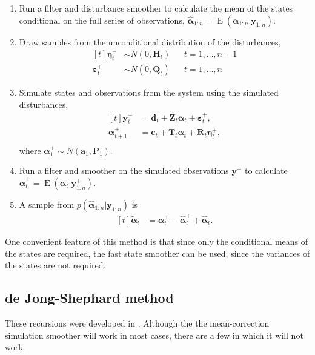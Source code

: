 \documentclass[]{book}
\providecommand{\tightlist}{%
  \setlength{\itemsep}{0pt}\setlength{\parskip}{0pt}}
\DeclareMathOperator{\E}{E}
\newcommand{\mat}[1]{\boldsymbol{#1}}
\renewcommand{\vec}[1]{\boldsymbol{#1}}
\begin{document}
\begin{enumerate}
\def\labelenumi{\arabic{enumi}.}
\tightlist
\item
  Run a filter and disturbance smoother to calculate the mean of the
  states conditional on the full series of observations,
  \(\hat{\vec{\alpha}}_{1:n} = \E(\vec{\alpha}_{1:n} | \vec{y}_{1:n})\).
\item
  Draw samples from the unconditional distribution of the disturbances,
  \[
  \begin{aligned}[t]
  \vec{\eta}^+_t &\sim N(0, \mat{H}_t) && t = 1, \dots, n - 1 \\
  \vec{\varepsilon}^+_t &\sim N(0, \mat{Q}_t) && t = 1, \dots, n
  \end{aligned}
  \]
\item
  Simulate states and observations from the system using the simulated
  disturbances, \[
  \begin{aligned}[t]
  \vec{y}^+_t &= \vec{d}_t + \mat{Z}_t \vec{\alpha}_t + \vec{\varepsilon}^+_t, \\
  \vec{\alpha}^+_{t + 1} &= \vec{c}_t + \mat{T}_t \vec{\alpha}_t + \mat{R}_t \vec{\eta}^+_t, \\
  \end{aligned}
  \] where \(\vec{\alpha}^+_1 \sim N(\vec{a}_1, \mat{P}_1)\).
\item
  Run a filter and smoother on the simulated observations \(\vec{y}^+\)
  to calculate
  \(\hat{\vec{\alpha}}_t^+ = \E(\vec{\alpha}_t | \vec{y}^+_{1:n})\).
\item
  A sample from \(p(\hat{\vec{\alpha}}_{1:n} | \vec{y}_{1:n})\) is \[
  \begin{aligned}[t]
  \tilde{\vec{\alpha}}_t &= \vec{\alpha}^+_t - \hat{\vec{\alpha}}^+_t + \hat{\vec{\alpha}}_t .
  \end{aligned}
  \]
\end{enumerate}

One convenient feature of this method is that since only the conditional
means of the states are required, the fast state smoother can be used,
since the variances of the states are not required.

\subsection{de Jong-Shephard method}\label{de-jong-shephard-method}

These recursions were developed in \textcite{DeJongShephard1995} .
Although the the mean-correction simulation smoother will work in most
cases, there are a few in which it will not work.
\end{document}
